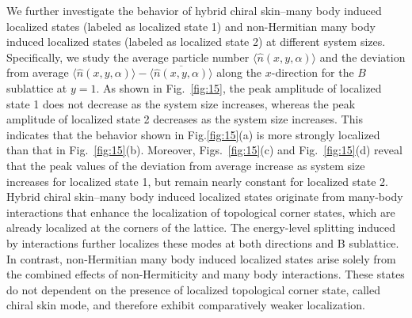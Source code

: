 \documentclass[longbibliography, aps, prx, amsmath, amssymb, amsfonts, twocolumn,superscriptaddress, footinbib]{revtex4-1}
\begin{document}
	We further investigate the behavior of hybrid chiral skin–many body induced localized states (labeled as localized state 1) and non-Hermitian many body induced localized states (labeled as localized state 2) at different system sizes. Specifically, we study the average particle number $\langle \hat{n}(x, y, \alpha) \rangle$ and the deviation from average $\langle \hat{n}(x, y, \alpha) \rangle - \overline{\langle \hat{n}(x, y, \alpha) \rangle}$ along the $x$-direction for the $B$ sublattice at $y = 1$.
	As shown in Fig.~\ref{fig:15}, the peak amplitude of localized state 1 does not decrease as the system size increases, whereas the peak amplitude of localized state 2 decreases as the system size increases. This indicates that the behavior shown in Fig.\ref{fig:15}(a) is more strongly localized than that in Fig.~\ref{fig:15}(b).
	Moreover, Figs.~\ref{fig:15}(c) and Fig.~\ref{fig:15}(d) reveal that the peak values of the deviation from average increase as system size increases for localized state 1, but remain nearly constant for localized state 2.
	Hybrid chiral skin–many body induced localized states originate from many-body interactions that enhance the localization of topological corner states, which are already localized at the corners of the lattice. 
	The energy-level splitting induced by interactions further localizes these modes at both directions and B sublattice. 
	In contrast, non-Hermitian many body induced localized states arise solely from the combined effects of non-Hermiticity and many body interactions. These states do not dependent on the presence of localized topological corner state, called chiral skin mode, and therefore exhibit comparatively weaker localization.
\end{document}
